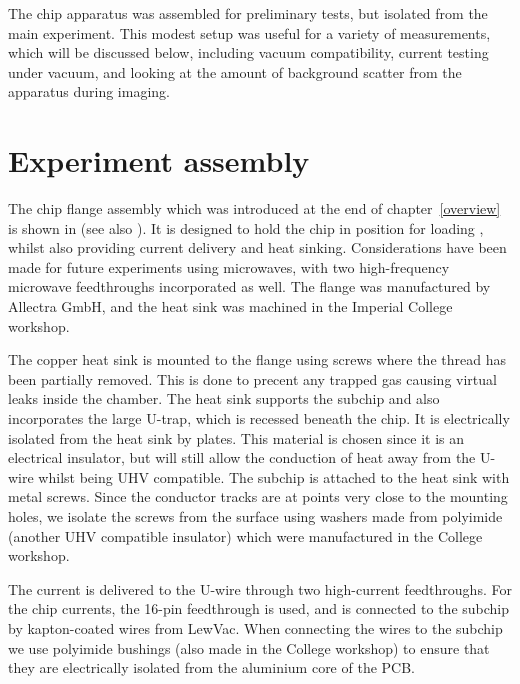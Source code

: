 The chip apparatus was assembled for preliminary tests, but isolated from the 
main \CaF{} experiment. This modest setup was useful for a variety of
measurements, which will be discussed below, including vacuum compatibility,
current testing under vacuum, and looking at the amount of background scatter
from the apparatus during imaging.

\section{Experiment assembly}

The chip flange assembly which was introduced at the end of
chapter~\ref{overview} is shown in  (see also
). It is designed
to hold the chip in position for loading \CaF{}, whilst also providing current
delivery and heat sinking. Considerations have been made for future experiments
using microwaves, with two high-frequency microwave feedthroughs incorporated
as well. The flange was manufactured by Allectra GmbH, and the heat sink was
machined in the Imperial College workshop.

\begin{figure}
  \centering
  \caption{}
  \label{exper:fig:flange}
\end{figure}

The copper heat sink is mounted to the flange using screws where the thread has
been partially removed. This is done to precent any trapped gas causing virtual
leaks inside the chamber. The heat sink supports the subchip and also
incorporates the large U-trap, which is recessed beneath the chip. It is
electrically isolated from the heat sink by \AlN{} plates. This material is
chosen since it is an electrical insulator, but will still allow the conduction
of heat away from the U-wire whilst being UHV compatible. The subchip is
attached to the heat sink with metal screws. Since the conductor tracks are at
points very close to the mounting holes, we isolate the screws from the surface
using washers made from polyimide (another UHV compatible insulator) which were
manufactured in the College workshop.

The current is delivered to the U-wire through two high-current feedthroughs.
For the chip currents, the 16-pin feedthrough is used, and is connected to the
subchip by kapton-coated wires from LewVac. When connecting the wires to the
subchip we use polyimide bushings (also made in the College workshop) to ensure
that they are electrically isolated from the aluminium core of the PCB.

